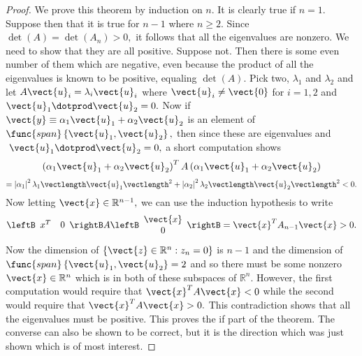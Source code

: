 \begin{proof}
We prove this theorem by induction on $n.$ It is clearly
true if $n=1.$ Suppose then that it is true for $n-1$ where $n\geq 2$. Since 
$\det \left( A\right) =\det \left( A_{n}\right) >0,$ it follows that all the
eigenvalues are nonzero. We need to show that they are all positive. Suppose
not. Then there is some even number of them which are negative, even because
the product of all the eigenvalues is known to be positive, equaling $\det
\left( A\right) $. Pick two, $\lambda _{1}$ and $\lambda _{2}$ and let $A
\vect{u}_{i}=\lambda _{i}\vect{u}_{i}$ where $\vect{u}_{i}\neq \vect{0}$ for $
i=1,2$ and $\vect{u}_{1}\dotprod \vect{u}_{2}=0.$ Now if $\vect{y}\equiv \alpha
_{1}\vect{u}_{1}+\alpha _{2}\vect{u}_{2}$ is an element of $\func{span}\left\{ 
\vect{u}_{1},\vect{u}_{2}\right\} ,$ then since these are eigenvalues and $\ 
\vect{u}_{1}\dotprod \vect{u}_{2}=0,$ a short computation shows 
\begin{equation*}
\left( \alpha _{1}\vect{u}_{1}+\alpha _{2}\vect{u}_{2}\right) ^{T}A\left(
\alpha _{1}\vect{u}_{1}+\alpha _{2}\vect{u}_{2}\right)
\end{equation*}
\begin{equation*}
=\left\vert \alpha _{1}\right\vert ^{2}\lambda _{1}\vectlength \vect{u}
_{1}\vectlength ^{2}+\left\vert \alpha _{2}\right\vert ^{2}\lambda
_{2}\vectlength \vect{u}_{2}\vectlength ^{2}<0.
\end{equation*}
Now letting $\vect{x}\in \mathbb{R}^{n-1},$ we can use the induction
hypothesis to write 
\begin{equation*}
\leftB
\begin{array}{cc}
x^{T} & 0
\end{array}
\rightB A\leftB 
\begin{array}{c}
\vect{x} \\ 
0
\end{array}
\rightB =\vect{x}^{T}A_{n-1}\vect{x}>0.
\end{equation*}
Now the dimension of $\left\{ \vect{z}\in \mathbb{R}^{n}:z_{n}=0\right\} $ is 
$n-1$ and the dimension of $\func{span}\left\{ \vect{u}_{1},\vect{u}
_{2}\right\} =2$ and so there must be some nonzero $\vect{x}\in \mathbb{R}
^{n} $ which is in both of these subspaces of $\mathbb{R}^{n}$. However, the
first computation would require that $\vect{x}^{T}A\vect{x}<0$ while the
second would require that $\vect{x}^{T}A\vect{x}>0.$ This contradiction shows
that all the eigenvalues must be positive. This proves the if part of the
theorem. The converse can also be shown to be correct, but it is the
direction which was just shown which is of most interest. 
\end{proof}

